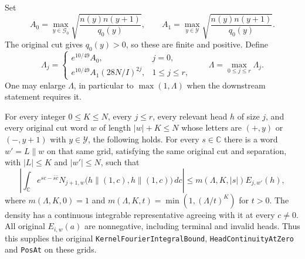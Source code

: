 Set
\[
 A_0=\max_{y\in\mathcal G_0}
       \sqrt{\frac{n(y)n(y+1)}{q_0(y)}},\qquad
 A_1=\max_{y\in\mathcal Y}
       \sqrt{\frac{n(y)n(y+1)}{q_0(y)}}.
\]
The original cut gives $q_0(y)>0$, so these are finite and
positive.  Define
\begin{equation}\label{kernel-fourier-Lambda}
 \Lambda_j=
 \begin{cases}
 e^{10/49}A_0,&j=0,\\
 e^{10/49}A_1(28N/I)^{2j},&1\le j\le r,
 \end{cases}
 \qquad \Lambda=\max_{0\le j\le r}\Lambda_j.
\end{equation}
One may enlarge $\Lambda$, in particular to $\max(1,\Lambda)$
when the downstream statement requires it.

\begin{theorem}\label{kernel-fourier-actual}
For every integer $0\le K\le N$, every $j\le r$, every
relevant head $h$ of size $j$, and every original cut word
$w$ of length $|w|+K\le N$ whose letters are
$(+,y)$ or $(-,y+1)$ with $y\in\mathcal Y$, the following holds.
For every $s\in\mathbb C$ there is a word $w'=L\mathbin{\|}w$
on that same grid, satisfying the same original cut and
separation, with $|L|\le K$ and $|w'|\le N$, such that
\begin{equation}\label{kernel-fourier-bound}
 \left|\int_{\mathbb C} e^{sc-\bar s\bar c}
 N_{j+1,w}\bigl(h\mathbin{\|}(1,c),h\mathbin{\|}(1,c)\bigr)
 \,dc\right|
 \le m(\Lambda,K,|s|)E_{j,w'}(h),
\end{equation}
where $m(\Lambda,K,0)=1$ and
$m(\Lambda,K,t)=\min(1,(\Lambda/t)^K)$ for $t>0$.
The density has a continuous integrable representative agreeing
with it at every $c\ne0$.
All original $E_{i,w}(a)$ are nonnegative, including terminal
and invalid heads.  Thus this supplies the original
\texttt{KernelFourierIntegralBound},
\texttt{HeadContinuityAtZero} and \texttt{PosAt} on these grids.
\end{theorem}

